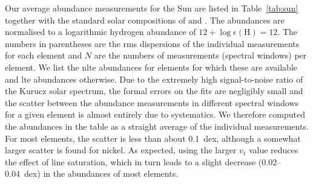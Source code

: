 \documentclass{aa}
\begin{document}
Our average abundance measurements for the Sun are listed in Table~\ref{tab:sun} together with the standard solar compositions of \citet[][hereafter GS1998]{Grevesse1998} and \citet[][A2009]{Asplund2009}. The abundances are normalised to a logarithmic hydrogen abundance of $12+\log \epsilon(\mathrm{H}) = 12$. The numbers in parentheses are the rms dispersions of the individual measurements for each element and $N$ are the numbers of measurements (spectral windows) per element. We list the \ac{nlte} abundances for elements for which these are available and \ac{lte} abundances otherwise. 
Due to the extremely high signal-to-noise ratio of the Kurucz solar spectrum, the formal errors on the fits are negligibly small and the scatter between the abundance measurements in different spectral windows for a given element  is almost entirely due to systematics.  We therefore computed the abundances in the table as a straight average of the individual measurements. 
For most elements, the scatter is less than about 0.1~dex, although a somewhat larger scatter is found for nickel.
As expected, using the larger $v_t$ value reduces the effect of line saturation, which in turn leads to a slight decrease (0.02--0.04~dex) in the abundances of most elements. 
\end{document}

